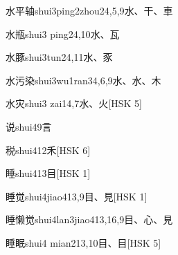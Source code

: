 \begin{EntryWithPhonetic}{水平轴}{shui3ping2zhou2}{4,5,9}{⽔、⼲、⾞}
\end{EntryWithPhonetic}

\begin{EntryWithPhonetic}{水瓶}{shui3 ping2}{4,10}{⽔、⽡}
\end{EntryWithPhonetic}

\begin{EntryWithPhonetic}{水豚}{shui3tun2}{4,11}{⽔、⾗}
\end{EntryWithPhonetic}

\begin{EntryWithPhonetic}{水污染}{shui3wu1ran3}{4,6,9}{⽔、⽔、⽊}
\end{EntryWithPhonetic}

\begin{EntryWithPhonetic}{水灾}{shui3 zai1}{4,7}{⽔、⽕}[HSK 5]
\end{EntryWithPhonetic}

\begin{EntryWithPhonetic}{说}{shui4}{9}{⾔}
\end{EntryWithPhonetic}

\begin{EntryWithPhonetic}{税}{shui4}{12}{⽲}[HSK 6]
\end{EntryWithPhonetic}

\begin{EntryWithPhonetic}{睡}{shui4}{13}{⽬}[HSK 1]
\end{EntryWithPhonetic}

\begin{EntryWithPhonetic}{睡觉}{shui4jiao4}{13,9}{⽬、⾒}[HSK 1]
\end{EntryWithPhonetic}

\begin{EntryWithPhonetic}{睡懒觉}{shui4lan3jiao4}{13,16,9}{⽬、⼼、⾒}
\end{EntryWithPhonetic}

\begin{EntryWithPhonetic}{睡眠}{shui4 mian2}{13,10}{⽬、⽬}[HSK 5]
\end{EntryWithPhonetic}

